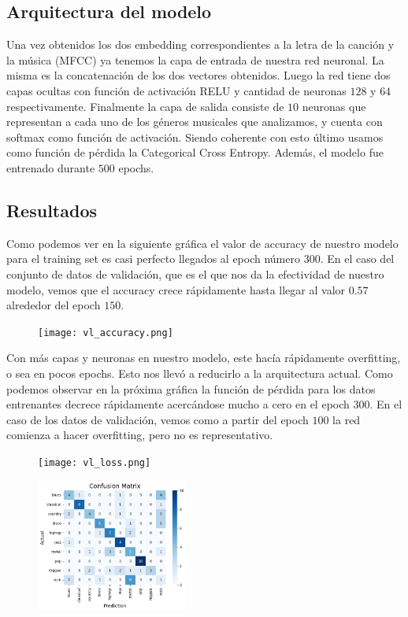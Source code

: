 \documentclass[colorinlistoftodos,twoside,twocolumn,10pt]{article} %
\begin{document}
\subsection{Arquitectura del modelo}

Una vez obtenidos los dos embedding correspondientes a la letra de la canci\'on y la m\'usica (MFCC) ya tenemos la capa de entrada de nuestra red neuronal. La misma es la concatenaci\'on de los dos vectores obtenidos. Luego la red tiene  dos capas ocultas con funci\'on de activaci\'on RELU y cantidad de neuronas $128$ y $64$ respectivamente. Finalmente la capa de salida consiste de $10$ neuronas que representan a cada uno de los g\'eneros musicales que analizamos, y cuenta con softmax como funci\'on de activaci\'on. Siendo coherente con esto \'ultimo usamos como funci\'on de p\'erdida la Categorical Cross Entropy. Adem\'as, el modelo fue entrenado durante $500$ epochs.


\subsection{Resultados}

Como podemos ver en la siguiente gr\'afica el valor de accuracy de nuestro modelo para el training set es casi perfecto llegados al epoch n\'umero $300$. En el caso del conjunto de  datos de validaci\'on, que es el que nos da la efectividad de nuestro modelo, vemos que el accuracy crece r\'apidamente hasta llegar al valor $0.57$ alrededor del epoch $150$.

\begin{figure}[h!]
	\texttt{[image: vl\_accuracy.png]}
\end{figure}

Con m\'as capas y neuronas en nuestro modelo, este hac\'ia r\'apidamente overfitting, o sea en pocos epochs. Esto nos llev\'o a reducirlo a la arquitectura actual. Como podemos observar en la pr\'oxima gr\'afica la funci\'on de p\'erdida para los datos entrenantes decrece r\'apidamente acerc\'andose mucho a cero en el epoch $300$. En el caso de los datos de validaci\'on, vemos como a partir del epoch $100$ la red comienza a hacer overfitting, pero no es representativo. 

\begin{figure}[h!]
	\texttt{[image: vl\_loss.png]}
\end{figure}


\begin{figure}[h!]
	\includegraphics[width=5cm]{vl_confussion_matrix.png}
\end{figure}
\end{document}
